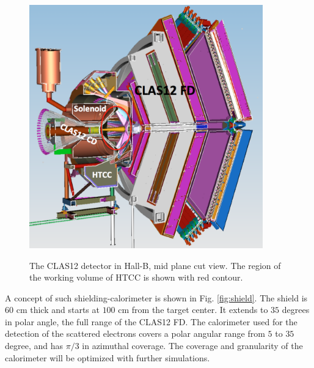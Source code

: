 \begin{figure}[h]
\centering
{\includegraphics[width=0.9\textwidth]{clas12.pdf}}
\caption{The CLAS12 detector in Hall-B, mid plane cut view. The region of the working volume of HTCC is shown with red contour.}
\label{fig:clas12}
\end{figure}

A concept of such shielding-calorimeter is shown in Fig. \ref{fig:shield}. The shield is $60$ cm thick and starts at $100$ cm from the target center. It extends to $35$ degrees in polar angle, the full range of the CLAS12 FD. The calorimeter used for the detection of the scattered electrons covers a polar angular range from $5$ to $35$ degree, and has $\pi/3$ in azimuthal coverage. The coverage and granularity of the calorimeter will be optimized with further simulations. 

